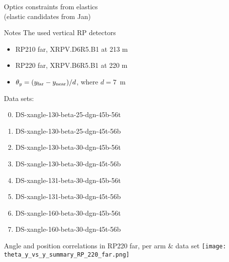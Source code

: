 \documentclass{beamer}
\begin{document}
\begin{frame}\scriptsize
	\Large
	\begin{center}
		Optics constraints from elastics\\{\small (elastic candidates from Jan)}
	\end{center}
\end{frame}

\begin{frame}\scriptsize
	\begin{block}{Notes}
		The used vertical RP detectors
		\begin{itemize}
			\item RP210 far, XRPV.D6R5.B1 at 213 m
			\item RP220 far, XRPV.B6R5.B1 at 220 m
			\item $\theta_{y}=(y_{\rm far} - y_{\rm near})/ d$, where $d=7$~m
		\end{itemize}
		
		Data sets:
		\begin{enumerate}
			\setcounter{enumi}{-1}
		\item DS-xangle-130-beta-25-dgn-45b-56t
		\item DS-xangle-130-beta-25-dgn-45t-56b
		\item DS-xangle-130-beta-30-dgn-45b-56t
		\item DS-xangle-130-beta-30-dgn-45t-56b
		\item DS-xangle-131-beta-30-dgn-45b-56t
		\item DS-xangle-131-beta-30-dgn-45t-56b
		\item DS-xangle-160-beta-30-dgn-45b-56t
		\item DS-xangle-160-beta-30-dgn-45t-56b
		\end{enumerate}

	\end{block}
\end{frame}



\begin{frame}\scriptsize
	\begin{block}{Angle and position correlations in RP220 far, per arm \& data set}\scriptsize
		\centering
             \texttt{[image: theta\_y\_vs\_y\_summary\_RP\_220\_far.png]}
	\end{block}
\end{frame}
\end{document}
